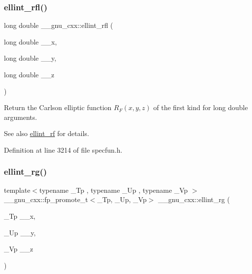 \mbox{\label{group__gnu__math__spec__func_ga38dd36b3db5bbe5da516d0cbe3ff1f21}} 
\subsubsection{\texorpdfstring{ellint\+\_\+rfl()}{ellint\_rfl()}}
{\footnotesize\ttfamily long double \+\_\+\+\_\+gnu\+\_\+cxx\+::ellint\+\_\+rfl (\begin{DoxyParamCaption}\item[{long double}]{\+\_\+\+\_\+x,  }\item[{long double}]{\+\_\+\+\_\+y,  }\item[{long double}]{\+\_\+\+\_\+z }\end{DoxyParamCaption})\hspace{0.3cm}{\ttfamily [inline]}}

Return the Carlson elliptic function $ R_F(x,y,z) $ of the first kind for {\ttfamily long double} arguments.

\begin{DoxySeeAlso}{See also}
\hyperlink{group__gnu__math__spec__func_gae4859494464c7eaf98193f92b2235bc1}{ellint\+\_\+rf} for details. 
\end{DoxySeeAlso}


Definition at line 3214 of file specfun.\+h.

\mbox{\label{group__gnu__math__spec__func_gadf618529d6106c1c1bc1e9212c4fed12}} 
\subsubsection{\texorpdfstring{ellint\+\_\+rg()}{ellint\_rg()}}
{\footnotesize\ttfamily template$<$typename \+\_\+\+Tp , typename \+\_\+\+Up , typename \+\_\+\+Vp $>$ \\
\+\_\+\+\_\+gnu\+\_\+cxx\+::fp\+\_\+promote\+\_\+t$<$\+\_\+\+Tp, \+\_\+\+Up, \+\_\+\+Vp$>$ \+\_\+\+\_\+gnu\+\_\+cxx\+::ellint\+\_\+rg (\begin{DoxyParamCaption}\item[{\+\_\+\+Tp}]{\+\_\+\+\_\+x,  }\item[{\+\_\+\+Up}]{\+\_\+\+\_\+y,  }\item[{\+\_\+\+Vp}]{\+\_\+\+\_\+z }\end{DoxyParamCaption})\hspace{0.3cm}{\ttfamily [inline]}}

